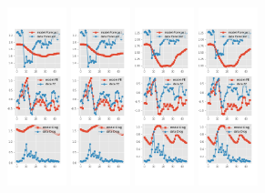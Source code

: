 \documentclass[]{article}
\begin{document}
\begin{figure}[ht]
\begin{subfigure}[b]{\textwidth}
	\includegraphics[width=0.19\textwidth]{figures/spf_se_est_joint_diag1.png}
	\includegraphics[width=0.19\textwidth]{figures/spf_se_est_joint_diag2.png}
	\includegraphics[width=0.19\textwidth]{figures/spf_se_est_joint_diag3.png}
	\includegraphics[width=0.19\textwidth]{figures/spf_se_est_joint_diag4.png}

\end{subfigure}
\end{figure}
\end{document}
